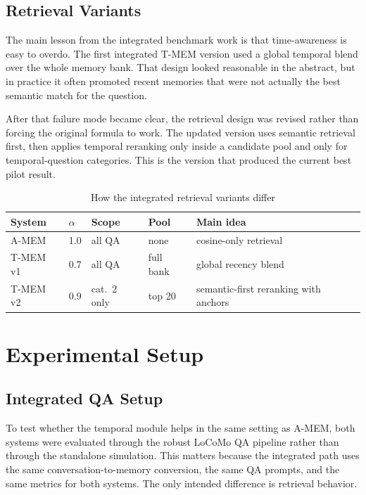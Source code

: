 \documentclass[conference]{IEEEtran}
\begin{document}
\subsection{Retrieval Variants}

The main lesson from the integrated benchmark work is that time-awareness is easy to overdo. The first integrated T-MEM version used a global temporal blend over the whole memory bank. That design looked reasonable in the abstract, but in practice it often promoted recent memories that were not actually the best semantic match for the question.

After that failure mode became clear, the retrieval design was revised rather than forcing the original formula to work. The updated version uses semantic retrieval first, then applies temporal reranking only inside a candidate pool and only for temporal-question categories. This is the version that produced the current best pilot result.

\begin{table}[htbp]
\caption{How the integrated retrieval variants differ}
\label{tab:variants}
\centering
\small
\begin{tabular}{p{1.8cm}p{1.1cm}p{1.0cm}p{1.0cm}p{2.4cm}}
\toprule
\textbf{System} & \textbf{$\alpha$} & \textbf{Scope} & \textbf{Pool} & \textbf{Main idea} \\
\midrule
A-MEM & 1.0 & all QA & none & cosine-only retrieval \\
T-MEM v1 & 0.7 & all QA & full bank & global recency blend \\
T-MEM v2 & 0.9 & cat.\ 2 only & top 20 & semantic-first reranking with anchors \\
\bottomrule
\end{tabular}
\end{table}

\section{Experimental Setup}

\subsection{Integrated QA Setup}

To test whether the temporal module helps in the same setting as A-MEM, both systems were evaluated through the robust LoCoMo QA pipeline rather than through the standalone simulation. This matters because the integrated path uses the same conversation-to-memory conversion, the same QA prompts, and the same metrics for both systems. The only intended difference is retrieval behavior.
\end{document}
